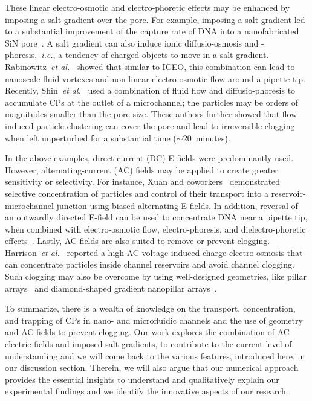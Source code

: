 \documentclass[twoside,twocolumn,9pt]{article}
\begin{document}
These linear electro-osmotic and electro-phoretic effects may be enhanced by imposing a salt gradient over the pore. 
For example, imposing a salt gradient led to a substantial improvement of the capture rate of DNA into a nanofabricated SiN pore~\cite{wanunu_electrostatic_2010, chou_enhancement_2009, hatlo_Rene_translocation_2011}. 
A salt gradient can also induce ionic diffusio-osmosis and -phoresis,~\textit{i.e.}, a tendency of charged objects to move in a salt gradient. 
Rabinowitz~\textit{et al.}~\cite{rabinowitz_nanoscale_2019} showed that similar to ICEO, this combination can lead to nanoscale fluid vortexes and non-linear electro-osmotic flow around a pipette tip. 
Recently, Shin~\textit{et al.}~\cite{PhysRevX.7.041038} used a combination of fluid flow and diffusio-phoresis to accumulate CPs at the outlet of a microchannel; the particles may be orders of magnitudes smaller than the pore size. 
These authors further showed that flow-induced particle clustering can cover the pore and lead to irreversible clogging when left unperturbed for a substantial time ($\sim 20$~minutes).

In the above examples, direct-current (DC) E-fields were predominantly used. 
However, alternating-current (AC) fields may be applied to create greater sensitivity or selectivity. 
For instance, Xuan and coworkers~\cite{zhu_electrokinetic_2012, patel_microfluidic_2012, xuan_reservoir-based_2013, patel_reservoir-based_2013, kale_joule_2014, lu_viscoelastic_2015, kale_three-dimensional_2018} demonstrated selective concentration of particles and control of their transport into a reservoir-microchannel junction using biased alternating E-fields. 
In addition, reversal of an outwardly directed E-field can be used to concentrate DNA near a pipette tip, when combined with electro-osmotic flow, electro-phoresis, and dielectro-phoretic effects~\cite{klenerman_ying_programmable_2002, ying_frequency_2004}. 
Lastly, AC fields are also suited to remove or prevent clogging. Harrison~\textit{et al.}~\cite{harrison_electrokinetic_2015} reported a high AC voltage induced-charge electro-osmosis that can concentrate particles inside channel reservoirs and avoid channel clogging. 
Such clogging may also be overcome by using well-designed geometries, like pillar arrays~\cite{wang_clog-free_2014} and diamond-shaped gradient nanopillar arrays~\cite{wang_hydrodynamics_2015, karlsen_pressure_2015}.

To summarize, there is a wealth of knowledge on the transport, concentration, and trapping of CPs in nano- and microfluidic channels and the use of geometry and AC fields to prevent clogging. 
Our work explores the combination of AC electric fields and imposed salt gradients, to contribute to the current level of understanding and we will come back to the various features, introduced here, in our discussion section. Therein, we will also argue that our numerical approach provides the essential insights to understand and qualitatively explain our experimental findings and we identify the innovative aspects of our research. 
\end{document}
